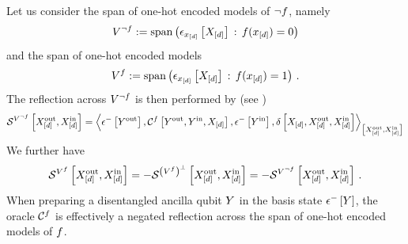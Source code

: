 Let us consider the span of one-hot encoded models of $\lnot f$, namely
\begin{align*}
    V^{\lnot f}
    := \mathrm{span}\left(\epsilon_{x_{[d]}}\left[X_{[d]}\right]\,:\,f(x_{[d]})=0\right)
\end{align*}
and the span of one-hot encoded models
\begin{align*}
    V^{f}
    :=\mathrm{span}\left(\epsilon_{x_{[d]}}\left[X_{[d]}\right]\,:\,f(x_{[d]})=1\right) \, .
\end{align*}
The reflection across $V^{\lnot f}$ is then performed by (see )
\begin{align*}
    \mathcal{S}^{V^{\lnot f}}\left[X_{[d]}^{\mathrm{out}},X_{[d]}^{\mathrm{in}}\right]
    = \left\langle 
        \epsilon^{-}\left[Y^{\mathrm{out}}\right],
        \mathcal{C}^{f}\left[Y^{\mathrm{out}},Y^{\mathrm{in}},X_{[d]}\right],
        \epsilon^{-}\left[Y^{\mathrm{in}}\right],
        \delta\left[X_{[d]},X_{[d]}^{\mathrm{out}},X_{[d]}^{\mathrm{in}}\right]
    \right\rangle_{\left[ X_{[d]}^{\mathrm{out}},X_{[d]}^{\mathrm{in}} \right]}
\end{align*}
We further have
\begin{align*}
    \mathcal{S}^{V^{f}}\left[X_{[d]}^{\mathrm{out}},X_{[d]}^{\mathrm{in}}\right]
    = -\mathcal{S}^{\left(V^{f}\right)^{\perp}}\left[X_{[d]}^{\mathrm{out}},X_{[d]}^{\mathrm{in}}\right]
    = -\mathcal{S}^{V^{\lnot f}}\left[X_{[d]}^{\mathrm{out}},X_{[d]}^{\mathrm{in}}\right] \, .
\end{align*}
When preparing a disentangled ancilla qubit $Y$ in the basis state $\epsilon^{-}\left[Y\right]$, the oracle $\mathcal{C}^{f}$ is effectively a negated reflection across the span of one-hot encoded models of $f$.



